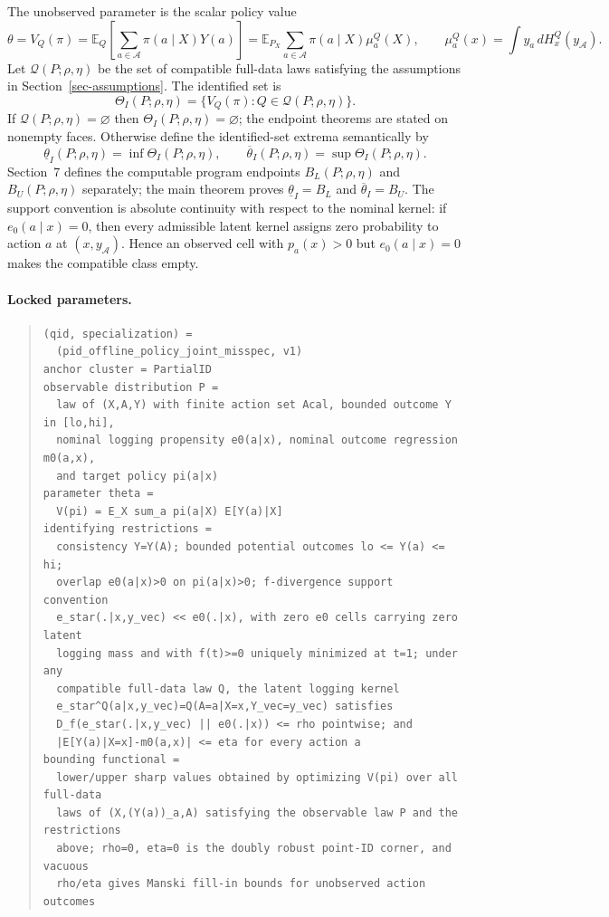 \documentclass[11pt]{article}
\newcommand{\E}{\mathbb{E}}
\theoremstyle{definition}
\theoremstyle{plain}
\theoremstyle{remark}
\begin{document}
The unobserved parameter is the scalar policy value
\[
  \theta=V_Q(\pi)
  =\E_Q\!\left[\sum_{a\in\mathcal A}\pi(a\mid X)Y(a)\right]
  =\E_{P_X}\sum_{a\in\mathcal A}\pi(a\mid X)\mu_a^Q(X),
  \qquad
  \mu_a^Q(x)=\int y_a\,dH_x^Q(y_{\mathcal A}).
\]
Let $\mathcal Q(P;\rho,\eta)$ be the set of compatible full-data laws satisfying
the assumptions in Section~\ref{sec-assumptions}.  The identified set is
\[
  \Theta_I(P;\rho,\eta)
  =\{V_Q(\pi):Q\in\mathcal Q(P;\rho,\eta)\}.
\]
If $\mathcal Q(P;\rho,\eta)=\varnothing$ then $\Theta_I(P;\rho,\eta)=\varnothing$;
the endpoint theorems are stated on nonempty faces.  Otherwise define the
identified-set extrema semantically by
\[
  \underline{\theta}_I(P;\rho,\eta)=\inf \Theta_I(P;\rho,\eta),\qquad
  \overline{\theta}_I(P;\rho,\eta)=\sup \Theta_I(P;\rho,\eta).
\]
Section~7 defines the computable program endpoints
$B_L(P;\rho,\eta)$ and $B_U(P;\rho,\eta)$ separately; the main theorem proves
$\underline{\theta}_I=B_L$ and $\overline{\theta}_I=B_U$.
The support convention is absolute continuity with respect to the nominal
kernel: if $e_0(a\mid x)=0$, then every admissible latent kernel assigns zero
probability to action $a$ at $(x,y_{\mathcal A})$.  Hence an observed cell with
$p_a(x)>0$ but $e_0(a\mid x)=0$ makes the compatible class empty.

\paragraph{Locked parameters.}
\begin{quote}\small
\begin{verbatim}
(qid, specialization) =
  (pid_offline_policy_joint_misspec, v1)
anchor cluster = PartialID
observable distribution P =
  law of (X,A,Y) with finite action set Acal, bounded outcome Y in [lo,hi],
  nominal logging propensity e0(a|x), nominal outcome regression m0(a,x),
  and target policy pi(a|x)
parameter theta =
  V(pi) = E_X sum_a pi(a|X) E[Y(a)|X]
identifying restrictions =
  consistency Y=Y(A); bounded potential outcomes lo <= Y(a) <= hi;
  overlap e0(a|x)>0 on pi(a|x)>0; f-divergence support convention
  e_star(.|x,y_vec) << e0(.|x), with zero e0 cells carrying zero latent
  logging mass and with f(t)>=0 uniquely minimized at t=1; under any
  compatible full-data law Q, the latent logging kernel
  e_star^Q(a|x,y_vec)=Q(A=a|X=x,Y_vec=y_vec) satisfies
  D_f(e_star(.|x,y_vec) || e0(.|x)) <= rho pointwise; and
  |E[Y(a)|X=x]-m0(a,x)| <= eta for every action a
bounding functional =
  lower/upper sharp values obtained by optimizing V(pi) over all full-data
  laws of (X,(Y(a))_a,A) satisfying the observable law P and the restrictions
  above; rho=0, eta=0 is the doubly robust point-ID corner, and vacuous
  rho/eta gives Manski fill-in bounds for unobserved action outcomes
\end{verbatim}
\end{quote}
\end{document}
